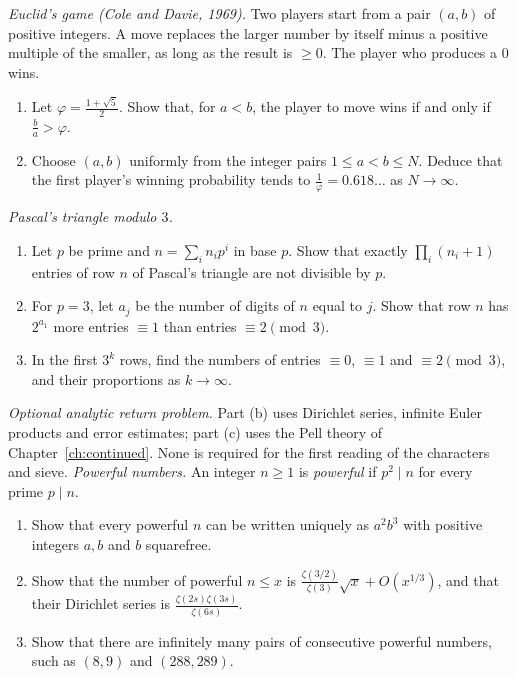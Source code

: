 \begin{exercise}[$\star\star$]\label{pb:euclidgame}
\emph{Euclid's game (Cole and Davie, 1969).} Two players start from a pair $(a,b)$ of positive integers. A move replaces the larger
number by itself minus a positive multiple of the smaller, as long as the result is $\ge0$. The player who produces a $0$ wins.
\begin{enumerate}[label=(\alph*)]
\item Let $\varphi=\frac{1+\sqrt5}2$. Show that, for $a<b$, the player to move wins if and only if $\frac ba>\varphi$.
\item Choose $(a,b)$ uniformly from the integer pairs $1\le a<b\le N$. Deduce that the first player's winning probability tends to $\frac1\varphi=0.618\ldots$ as $N\to\infty$.
\end{enumerate}
\end{exercise}

\begin{exercise}[$\star\star$]\label{pb:pascalthree}
\emph{Pascal's triangle modulo $3$.}
\begin{enumerate}[label=(\alph*)]
\item Let $p$ be prime and $n=\sum_in_ip^i$ in base $p$. Show that exactly $\prod_i(n_i+1)$ entries of row $n$ of Pascal's triangle
are not divisible by $p$.
\item For $p=3$, let $a_j$ be the number of digits of $n$ equal to $j$. Show that row $n$ has $2^{a_1}$ more entries $\equiv1$ than
entries $\equiv2\pmod3$.
\item In the first $3^k$ rows, find the numbers of entries $\equiv0$, $\equiv1$ and $\equiv2\pmod3$, and their proportions as
$k\to\infty$.
\end{enumerate}
\end{exercise}

\begin{exercise}[$\star\star$]\label{pb:powerful}
\emph{Optional analytic return problem.} Part (b) uses Dirichlet
series, infinite Euler products and error estimates; part (c) uses
the Pell theory of Chapter~\ref{ch:continued}.
None is required for the first reading of the characters and sieve.
\emph{Powerful numbers.} An integer $n\ge1$ is \emph{powerful} if $p^2\mid n$ for every prime $p\mid n$.
\begin{enumerate}[label=(\alph*)]
\item Show that every powerful $n$ can be written uniquely as $a^2b^3$ with positive integers $a,b$ and $b$ squarefree.
\item Show that the number of powerful $n\le x$ is $\frac{\zeta(3/2)}{\zeta(3)}\sqrt x+O(x^{1/3})$, and that their Dirichlet series is
$\frac{\zeta(2s)\zeta(3s)}{\zeta(6s)}$.
\item Show that there are infinitely many pairs of consecutive powerful numbers, such as $(8,9)$ and $(288,289)$.
\end{enumerate}
\end{exercise}

